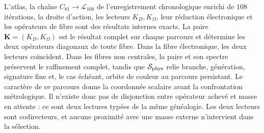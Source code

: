 \begin{statusbox}[title={Domaine exact et réalisation physique achevée}]
L'atlas, la chaîne \(C_{81}\to\mathcal L_{108}\) de l'enregistrement chronologique
enrichi de \(108\) itérations,
la droite d'action,
les lecteurs \(K_D,K_\Omega\), leur réduction électronique et les opérateurs de
fibre sont des résultats internes exacts. La paire
\(\mathbf K=(K_D,K_\Omega)\) est le résultat complet sur chaque parcours et
détermine les deux opérateurs diagonaux de toute fibre. Dans la fibre
électronique, les deux lecteurs coïncident. Dans les fibres non centrales, la paire et son
spectre préservent le raffinement complet, tandis que
\(\mathcal S_{\rm phys}\) relie branche, génération, signature fine et, le cas
échéant, orbite de couleur au parcours persistant. Le caractère de ce parcours
donne la coordonnée scalaire avant la confrontation métrologique. Il n'existe donc pas
de disjonction entre opérateur achevé et masse en attente : ce sont deux lectures
typées de la même généalogie. Les deux lecteurs sont codirecteurs, et aucune
proximité avec une masse externe n'intervient dans la sélection.
\end{statusbox}

